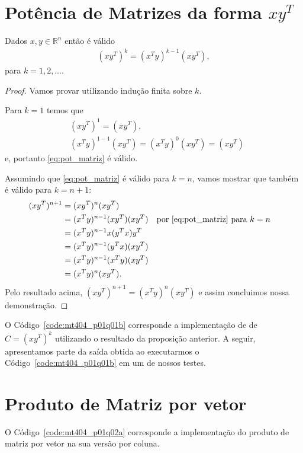 \documentclass[12pt,a4paper]{article}
\begin{document}
\section{Pot\^{e}ncia de Matrizes da forma $xy^T$}
\begin{prop}
    Dados $x, y \in \mathbb{R}^n$ então é válido
    \begin{align}
        (x y^T)^k = (x^T y)^{k - 1} (x y^T), \label{eq:pot_matriz}
    \end{align}
para $k = 1, 2, \ldots$.
\end{prop}
\begin{proof}
    Vamos provar utilizando indução finita sobre $k$.
    
    Para $k = 1$ temos que
    \begin{align*}
        & (x y^T)^1 = (x y^T), \\
        & (x^T y)^{1 - 1} (x y^T) = (x^T y)^0 (x y^T) = (x y^T)
    \end{align*}
    e, portanto \eqref{eq:pot_matriz} é válido.
    
    Assumindo que \eqref{eq:pot_matriz} é válido para $k = n$, vamos mostrar que também é válido para $k = n + 1$:
    \begin{align*}
        (x y^T)^{n + 1} &= (x y^T)^n (x y^T)  \\
        &= (x^T y)^{n - 1} (x y^T) (x y^T) && \text{por \eqref{eq:pot_matriz} para $k = n$}\\
        &= (x^T y)^{n - 1} x (y^T x) y^T \\
        &= (x^T y)^{n - 1} (y^T x) (x y^T) \\
        &= (x^T y)^{n - 1} (x^T y) (x y^T) \\
        &= (x^T y)^{n} (x y^T).
    \end{align*}
    Pelo resultado acima, $(x y^T)^{n + 1} = (x^T y)^{n} (x y^T)$ e assim concluimos nossa demonstração.
\end{proof}

O Código~\ref{code:mt404_p01q01b} corresponde a implementação de de $C = (x y^T)^k$ utilizando o resultado da proposição anterior. A seguir, apresentamos parte da saída obtida ao executarmos o Código~\ref{code:mt404_p01q01b} em um de nossos testes.


\section{Produto de Matriz por vetor}
O Código~\ref{code:mt404_p01q02a} corresponde a implementação do produto de matriz por vetor na sua versão por coluna.

\end{document}
